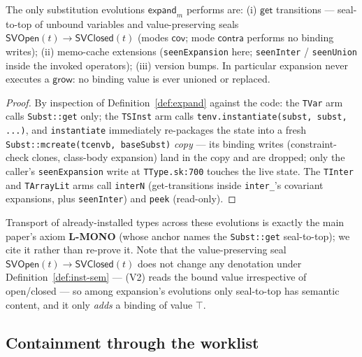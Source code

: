 \documentclass[11pt]{article}
\newcommand{\SVOpen}{\mathsf{SVOpen}}
\newcommand{\SVClosed}{\mathsf{SVClosed}}
\newcommand{\expandop}{\mathsf{expand}}
\newcommand{\Cov}{\mathsf{cov}}
\newcommand{\Contra}{\mathsf{contra}}
\newcommand{\getop}{\mathsf{get}}
\begin{document}
\begin{lemma}
\label{lem:evolutions}
The only substitution evolutions $\expandop_m$ performs are:
(i) $\getop$ transitions — seal-to-top of unbound variables and
value-preserving seals $\SVOpen(t) \to \SVClosed(t)$ (modes
$\Cov$; mode $\Contra$ performs no binding writes); (ii) memo-cache
extensions (\texttt{seenExpansion} here; \texttt{seenInter} /
\texttt{seenUnion} inside the invoked operators); (iii) version bumps.
In particular expansion never executes a $\mathsf{grow}$: no binding
value is ever unioned or replaced.
\end{lemma}
\begin{proof}
By inspection of Definition~\ref{def:expand} against the code: the
\texttt{TVar} arm calls \texttt{Subst::get} only; the \texttt{TSInst}
arm calls \texttt{tenv.instantiate(subst, subst, ...)}, and
\texttt{instantiate} immediately re-packages the state into a fresh
\texttt{Subst::mcreate(tcenvb, baseSubst)} \emph{copy} — its binding
writes (constraint-check clones, class-body expansion) land in the copy
and are dropped; only the caller's \texttt{seenExpansion} write at
\texttt{TType.sk:700} touches the live state. The \texttt{TInter} and
\texttt{TArrayLit} arms call \texttt{interN} (get-transitions inside
\texttt{inter\_}'s covariant expansions, plus \texttt{seenInter}) and
\texttt{peek} (read-only). \qedhere
{}
\end{proof}

Transport of already-installed types across these evolutions is exactly
the main paper's axiom \textbf{L-MONO} (whose anchor names the
\texttt{Subst::get} seal-to-top); we cite it rather than re-prove it.
Note that the value-preserving seal $\SVOpen(t) \to \SVClosed(t)$ does not
change any denotation under Definition~\ref{def:inst-sem} — (V2) reads the
bound value irrespective of open/closed — so among expansion's evolutions
only seal-to-top has semantic content, and it only \emph{adds} a binding
of value $\top$.

\subsection{Containment through the worklist}
\end{document}
